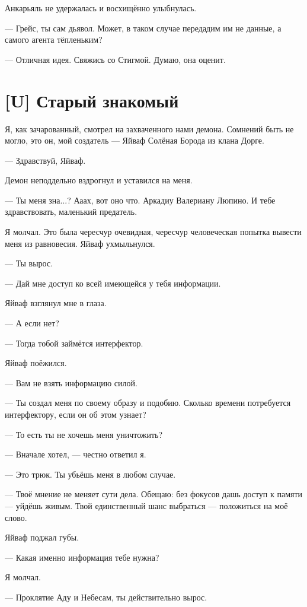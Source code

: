 Анкарьяль не удержалась и восхищённо улыбнулась.

--- Грейс, ты сам дьявол.
Может, в таком случае передадим им не данные, а самого агента тёпленьким?

--- Отличная идея.
Свяжись со Стигмой.
Думаю, она оценит.

\section{[U] Старый знакомый}

\textspace

Я, как зачарованный, смотрел на захваченного нами демона.
Сомнений быть не могло, это он, мой создатель --- Яйваф Солёная Борода из клана Дорге.

--- Здравствуй, Яйваф.

Демон неподдельно вздрогнул и уставился на меня.

--- Ты меня зна...?
Ааах, вот оно что.
Аркадиу Валериану Люпино.
И тебе здравствовать, маленький предатель.

Я молчал.
Это была чересчур очевидная, чересчур человеческая попытка вывести меня из равновесия.
Яйваф ухмыльнулся.

--- Ты вырос.

--- Дай мне доступ ко всей имеющейся у тебя информации.

Яйваф взглянул мне в глаза.

--- А если нет?

--- Тогда тобой займётся интерфектор.

Яйваф поёжился.

--- Вам не взять информацию силой.

--- Ты создал меня по своему образу и подобию.
Сколько времени потребуется интерфектору, если он об этом узнает?

--- То есть ты не хочешь меня уничтожить?

--- Вначале хотел, --- честно ответил я.

--- Это трюк.
Ты убьёшь меня в любом случае.

--- Твоё мнение не меняет сути дела.
Обещаю: без фокусов дашь доступ к памяти --- уйдёшь живым.
Твой единственный шанс выбраться --- положиться на моё слово.

Яйваф поджал губы.

--- Какая именно информация тебе нужна?

Я молчал.

--- Проклятие Аду и Небесам, ты действительно вырос.

